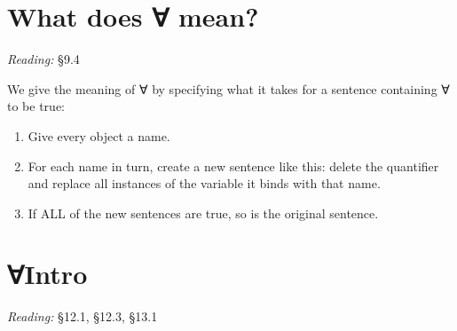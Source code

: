 \documentclass[12pt]{extarticle}
\begin{document}
\begin{multicols*}{3}
\begin{minipage}{\columnwidth}
\end{minipage}
 
 
 
\section{What does ∀ mean?}
 
\emph{Reading:} §9.4
 
We give the meaning of ∀ by specifying what it takes for a sentence containing ∀ to be true:
 
\begin{enumerate}
 
\item Give every object a name.
 
\item For each name in turn, create a new sentence like this: delete the quantifier and replace all instances of the variable it binds with that name.
 
\item If ALL of the new sentences are true, so is the original sentence.
 
\end{enumerate}
 
 
\begin{minipage}{\columnwidth}

\section{∀Intro}
 
\emph{Reading:} §12.1, §12.3, §13.1
 

\end{minipage}
\end{multicols*}
\end{document}
